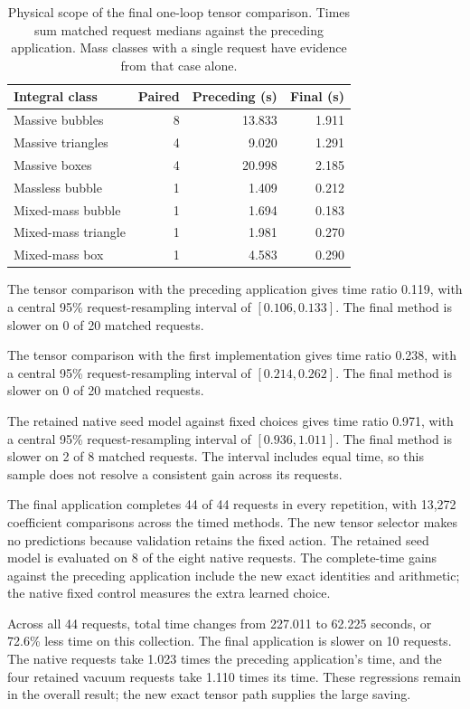 \begin{table}[!htbp]\centering\small
\caption{Physical scope of the final one-loop tensor comparison. Times sum matched request medians against the preceding application. Mass classes with a single request have evidence from that case alone.}
\label{tab:notes-tensor-types}
\begin{tabularx}{\linewidth}{@{}Yrrr@{}}\toprule
Integral class & Paired & Preceding (s) & Final (s)\\\midrule
Massive bubbles & 8 & 13.833 & 1.911 \\
Massive triangles & 4 & 9.020 & 1.291 \\
Massive boxes & 4 & 20.998 & 2.185 \\
Massless bubble & 1 & 1.409 & 0.212 \\
Mixed-mass bubble & 1 & 1.694 & 0.183 \\
Mixed-mass triangle & 1 & 1.981 & 0.270 \\
Mixed-mass box & 1 & 4.583 & 0.290 \\
\bottomrule\end{tabularx}\end{table}\FloatBarrier

The tensor comparison with the preceding application gives time ratio 0.119, with a central 95\% request-resampling interval of $[0.106,0.133]$. The final method is slower on 0 of 20 matched requests.

The tensor comparison with the first implementation gives time ratio 0.238, with a central 95\% request-resampling interval of $[0.214,0.262]$. The final method is slower on 0 of 20 matched requests.

The retained native seed model against fixed choices gives time ratio 0.971, with a central 95\% request-resampling interval of $[0.936,1.011]$. The final method is slower on 2 of 8 matched requests. The interval includes equal time, so this sample does not resolve a consistent gain across its requests.

The final application completes 44 of 44 requests in every repetition, with 13,272 coefficient comparisons across the timed methods. The new tensor selector makes no predictions because validation retains the fixed action. The retained seed model is evaluated on 8 of the eight native requests. The complete-time gains against the preceding application include the new exact identities and arithmetic; the native fixed control measures the extra learned choice.

Across all 44 requests, total time changes from 227.011 to 62.225 seconds, or 72.6\% less time on this collection. The final application is slower on 10 requests. The native requests take 1.023 times the preceding application's time, and the four retained vacuum requests take 1.110 times its time. These regressions remain in the overall result; the new exact tensor path supplies the large saving.

